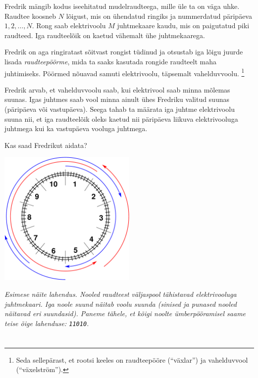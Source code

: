 \ifx\boi\undefined\fi
\def\version{jury-1}
Fredrik mängib kodus iseehitatud mudelraudteega, mille üle ta on väga uhke.
Raudtee koosneb $N$ lõigust, mis on ühendatud ringiks ja nummerdatud päripäeva $1, 2, \dots, N$.
Rong saab elektrivoolu $M$ juhtmekaare kaudu, mis on paigutatud piki raudteed. Iga raudteelõik on kaetud vähemalt ühe juhtmekaarega.

Fredrik on aga ringiratast sõitvast rongist tüdinud ja otsustab iga lõigu juurde lisada \emph{raudteepöörme}, mida ta saaks kasutada rongide raudteelt maha juhtimiseks. Pöörmed nõuavad samuti elektrivoolu, täpsemalt vahelduvvoolu. \footnote{Seda sellepärast, et rootsi keeles on raudteepööre (``växlar'') ja vahelduvvool (``växelström'').}

Fredrik arvab, et vahelduvvoolu saab, kui elektrivool saab minna mõlemas suunas.
Igas juhtmes saab vool minna ainult ühes Fredriku valitud suunas (päripäeva või vastupäeva).
Seega tahab ta määrata iga juhtme elektrivoolu suuna nii, et iga raudteelõik
oleks kaetud nii päripäeva liikuva elektrivooluga juhtmega kui ka vastupäeva vooluga juhtmega.

Kas saad Fredrikut aidata?

\vspace{2mm}
\begin{center}
\includegraphics[width=0.5\textwidth]{alternatingfig.pdf}
\end{center}
\vspace{1mm}
{\em Esimese näite lahendus. Nooled raudteest väljaspool tähistavad elektrivooluga juhtmekaari. Iga noole suund näitab voolu suunda (sinised ja punased nooled näitavad eri suundasid). Paneme tähele, et kõigi noolte ümberpööramisel saame teise õige lahenduse: \texttt{11010}.}

\section*{}

